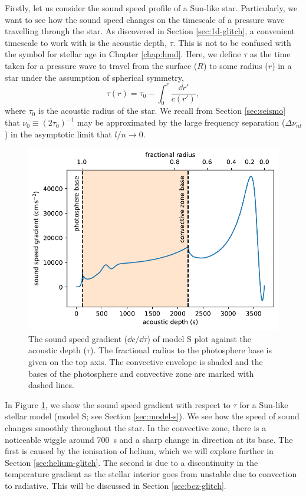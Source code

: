 Firstly, let us consider the sound speed profile of a Sun-like star. Particularly, we want to see how the sound speed changes on the timescale of a pressure wave travelling through the star. As discovered in Section \ref{sec:1d-glitch}, a convenient timescale to work with is the acoustic depth, \(\tau\). This is not to be confused with the symbol for stellar age in Chapter \ref{chap:hmd}. Here, we define \(\tau\) as the time taken for a pressure wave to travel from the surface (\(R\)) to some radius (\(r\)) in a star under the assumption of spherical symmetry,
%
\begin{equation}
    \tau(r) = \tau_0 - \int_0^{r} \frac{\dd r'}{c(r')},\label{eq:tau}
\end{equation}
%
where \(\tau_0\) is the acoustic radius of the star. We recall from Section \ref{sec:seismo} that \(\nu_0 \equiv (2\tau_0)^{-1}\) may be approximated by the large frequency separation (\(\Delta\nu_{nl}\)) in the asymptotic limit that \(l/n \rightarrow 0\).

\begin{figure}[tb]
    \centering
    \includegraphics{figures/sound-speed-gradient.pdf}
    \caption[The sound speed gradient of model S plot against the acoustic depth.]{The sound speed gradient (\(\dd c/\dd \tau\)) of model S plot against the acoustic depth (\(\tau\)). The fractional radius to the photosphere base is given on the top axis. The convective envelope is shaded and the bases of the photosphere and convective zone are marked with dashed lines.}
    \label{fig:sound-speed-gradient}
\end{figure}

In Figure \ref{fig:sound-speed-gradient}, we show the sound speed gradient with respect to \(\tau\) for a Sun-like stellar model (model S; see Section \ref{sec:model-s}). We see how the speed of sound changes smoothly throughout the star. In the convective zone, there is a noticeable wiggle around \SI{700}{\second} and a sharp change in direction at its base. The first is caused by the ionisation of helium, which we will explore further in Section \ref{sec:helium-glitch}. The second is due to a discontinuity in the temperature gradient as the stellar interior goes from unstable due to convection to radiative. This will be discussed in Section \ref{sec:bcz-glitch}.

